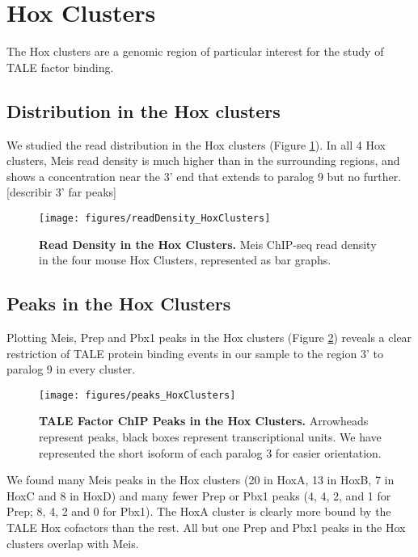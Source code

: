 \section{Hox Clusters}

The Hox clusters are a genomic region of particular interest for the study of \ac{TALE} factor binding. 

\subsection{Distribution in the Hox clusters}

We studied the read distribution in the Hox clusters (Figure \ref{fig:readDensity}). In all 4 Hox clusters, Meis read density is much higher than in the surrounding regions, and shows a concentration near the 3' end that extends to paralog 9 but no further. [describir 3' far peaks]

\begin{figure}[]
  \centering
  \texttt{[image: figures/readDensity\_HoxClusters]}
  \caption[Read Density in the Hox Clusters]{\textbf{Read Density in the Hox Clusters.} Meis ChIP-seq read density in the four mouse Hox Clusters, represented as bar graphs.}
  \label{fig:readDensity}
\end{figure}

\subsection{Peaks in the Hox Clusters}

Plotting Meis, Prep and Pbx1 peaks in the Hox clusters (Figure \ref{fig:peaksClusters}) reveals a clear restriction of \ac{TALE} protein binding events in our sample to the region 3' to paralog 9 in every cluster. 

\begin{figure}[]
  \centering
  \texttt{[image: figures/peaks\_HoxClusters]}
  \caption[TALE Factor ChIP Peaks in the Hox Clusters]{\textbf{TALE Factor ChIP Peaks in the Hox Clusters.} Arrowheads represent peaks, black boxes represent transcriptional units. We have represented the short isoform of each paralog 3 for easier orientation.}
  \label{fig:peaksClusters}
\end{figure}

We found many Meis peaks in the Hox clusters (20 in HoxA, 13 in HoxB, 7 in HoxC and 8 in HoxD) and many fewer Prep or Pbx1 peaks (4, 4, 2, and 1 for Prep; 8, 4, 2 and 0 for Pbx1). The HoxA cluster is clearly more bound by the \ac{TALE} Hox cofactors than the rest. All but one Prep and Pbx1 peaks in the Hox clusters overlap with Meis. 

